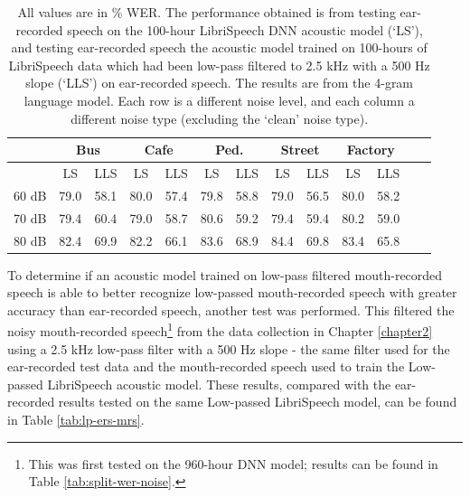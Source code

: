 \begin{table}[h]
\begin{center}
\begin{tabular}{| c || c | c | c | c | c | c | c | c | c | c | c | c |} \hline
      & \multicolumn{2}{|c|}{Bus} & \multicolumn{2}{|c|}{Cafe} & \multicolumn{2}{|c|}{Ped.} & \multicolumn{2}{|c|}{Street} & \multicolumn{2}{|c|}{Factory} \\ \hline
      & LS & LLS & LS & LLS & LS & LLS & LS & LLS & LS & LLS \\ \hline\hline
60 dB & 79.0 & 58.1 & 80.0 & 57.4 & 79.8 & 58.8 & 79.0 & 56.5 & 80.0 & 58.2  \\ \hline
70 dB & 79.4 & 60.4 & 79.0 & 58.7 & 80.6 & 59.2 & 79.4 & 59.4 & 80.2 & 59.0  \\ \hline
80 dB & 82.4 & 69.9 & 82.2 & 66.1 & 83.6 & 68.9 & 84.4 & 69.8 & 83.4 & 65.8  \\ \hline
\end{tabular}
\end{center}
\caption{All values are in \% WER. The performance obtained is from testing ear-recorded speech on the 100-hour LibriSpeech DNN acoustic model (`LS'), and testing ear-recorded speech the acoustic model trained on 100-hours of LibriSpeech data which had been low-pass filtered to 2.5 kHz with a 500 Hz slope (`LLS') on ear-recorded speech.  The results are from the 4-gram language model.  Each row is a different noise level, and each column a different noise type (excluding the `clean' noise type).}\label{tab:100HrDNNcmp}
\end{table}

To determine if an acoustic model trained on low-pass filtered mouth-recorded speech is able to better recognize low-passed mouth-recorded speech with greater accuracy than ear-recorded speech, another test was performed.  This filtered the noisy mouth-recorded speech\footnote{This was first tested on the 960-hour DNN model; results can be found in Table \ref{tab:split-wer-noise}.} from the data collection in Chapter \ref{chapter2} using a 2.5 kHz low-pass filter with a 500 Hz slope - the same filter used for the ear-recorded test data and the mouth-recorded speech used to train the Low-passed LibriSpeech acoustic model.  These results, compared with the ear-recorded results tested on the same Low-passed LibriSpeech model, can be found in Table \ref{tab:lp-ers-mrs}.


